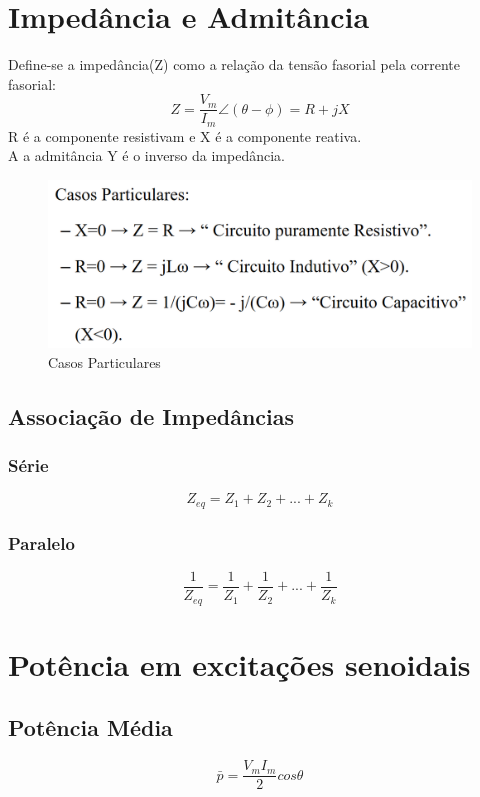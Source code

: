 \documentclass[a4paper, 12pt]{article}
\begin{document}
\section{Impedância e Admitância}
	Define-se a impedância(Z) como a relação da tensão fasorial pela corrente fasorial:
	\begin{equation}
		Z = \frac{V_m}{I_m} \angle (\theta - \phi) = R + jX
	\end{equation}
	R é a componente resistivam e X é a componente reativa.\\
	A a admitância Y é o inverso da impedância.
	
	\begin{figure}[h]
		\centering
		\includegraphics[scale=0.3]{a.png}
		\caption{Casos Particulares}
	\end{figure}
	
	\subsection{Associação de Impedâncias}
		\subsubsection{Série}
		\begin{equation}
			Z_{eq} = Z_1 + Z_2 + ... + Z_k 
		\end{equation}
		\subsubsection{Paralelo}
		\begin{equation}
			\frac{1}{Z_{eq}} = \frac{1}{Z_1} + \frac{1}{Z_2} + ... + \frac{1}{Z_k}
		\end{equation}
	
\section{Potência em excitações senoidais}
	\subsection{Potência Média}
		\begin{equation}
			\bar{p} = \frac{V_mI_m}{2} cos\theta
		\end{equation}
	
\end{document}
